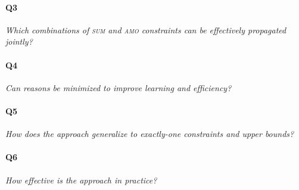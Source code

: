 \documentclass[preprint,authoryear]{elsarticle}
\theoremstyle{definition}
\begin{document}
\paragraph{Q3} \emph{Which combinations of \textsc{sum} and \textsc{amo} constraints can be effectively propagated jointly?}

\paragraph{Q4} \emph{Can reasons be minimized to improve learning and efficiency?}

\paragraph{Q5} \emph{How does the approach generalize to exactly-one constraints and upper bounds?}

\paragraph{Q6} \emph{How effective is the approach in practice?}
\medskip
\end{document}
